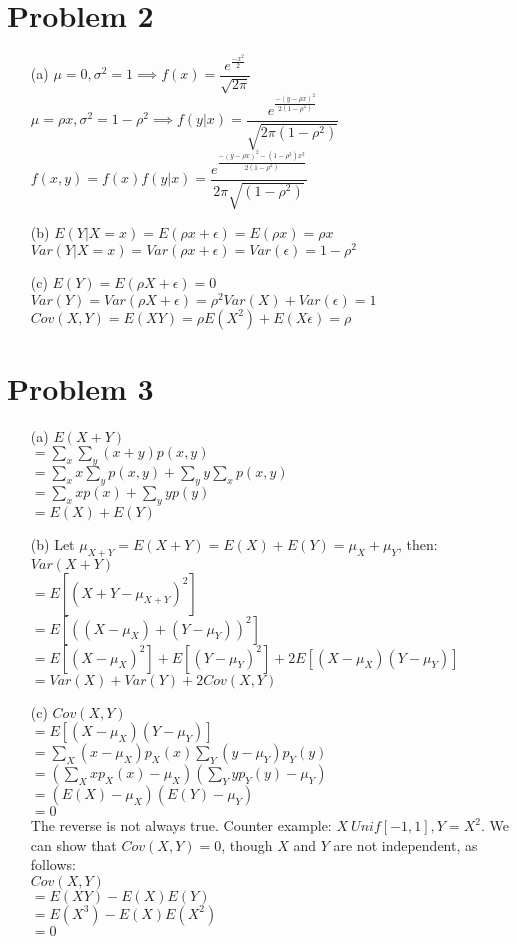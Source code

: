 \documentclass{article}
\begin{document}
\section*{Problem 2}
\begin{itemize}
	\item [(a)] $\mu=0,\sigma^2=1\implies f(x)=\boxed{\dfrac{e^\frac{-x^2}{2}}{\sqrt{2\pi}}}$\\$\mu=\rho x,\sigma^2=1-\rho^2\implies f(y|x)=\boxed{\dfrac{e^\frac{-(y-\rho x)^2}{2(1-\rho^2)}}{\sqrt{2\pi(1-\rho^2)}}}$\\$f(x,y)=f(x)f(y|x)=\boxed{\dfrac{e^{\frac{-(y-\rho x)^2-(1-\rho^2)x^2}{2(1-\rho^2)}}}{2\pi\sqrt{(1-\rho^2)}}}$
	\item [(b)] $E(Y|X=x)=E(\rho x+\epsilon)=E(\rho x)=\boxed{\rho x}$\\$Var(Y|X=x)=Var(\rho x+\epsilon)=Var(\epsilon)=\boxed{1-\rho^2}$
	\item [(c)] $E(Y)=E(\rho X+\epsilon)=\boxed{0}$\\$Var(Y)=Var(\rho X+\epsilon)=\rho^2Var(X)+Var(\epsilon)=\boxed{1}$\\$Cov(X,Y)=E(XY)=\rho E(X^2)+E(X\epsilon)=\boxed{\rho}$
\end{itemize}

\section*{Problem 3}
\begin{itemize}
	\item [(a)] $E(X+Y)$\\$=\sum_x\sum_y(x+y)p(x,y)$\\$=\sum_xx\sum_yp(x,y)+\sum_yy\sum_xp(x,y)$\\$=\sum_xxp(x)+\sum_yyp(y)$\\$=E(X)+E(Y)$
	\item [(b)] Let $\mu_{X+Y}=E(X+Y)=E(X)+E(Y)=\mu_X+\mu_Y$, then: \\$Var(X+Y)$\\$=E[(X+Y-\mu_{X+Y})^2]$\\$=E[((X-\mu_X)+(Y-\mu_Y))^2]$\\$=E[(X-\mu_X)^2]+E[(Y-\mu_Y)^2]+2E[(X-\mu_X)(Y-\mu_Y)]$\\$=Var(X)+Var(Y)+2Cov(X,Y)$
	\item [(c)] $Cov(X,Y)$\\$=E[(X-\mu_X)(Y-\mu_Y)]$\\$=\sum_X(x-\mu_X)p_X(x)\sum_Y(y-\mu_Y)p_Y(y)$\\$=(\sum_Xxp_X(x)-\mu_X)(\sum_Yyp_Y(y)-\mu_Y)$\\$=(E(X)-\mu_X)(E(Y)-\mu_Y)$\\$=0$\\The reverse is not always true. Counter example: $X~Unif[-1,1], Y=X^2$. We can show that $Cov(X,Y)=0$, though $X$ and $Y$ are not independent, as follows: \\$Cov(X,Y)$\\$=E(XY)-E(X)E(Y)$\\$=E(X^3)-E(X)E(X^2)$\\$=0$
\end{itemize}
\end{document}
